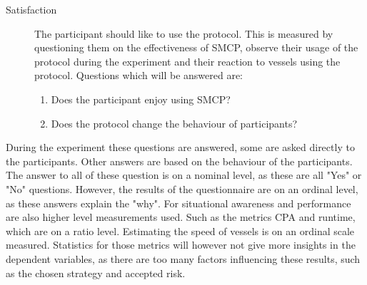 \begin{description}
	\item [Satisfaction] \satisfaction The participant should like to use the protocol. This is measured by questioning them on the effectiveness of \ac{SMCP}, observe their usage of the protocol during the experiment and their reaction to vessels using the protocol. Questions which will be answered are:
	\begin{enumerate}
		\item Does the participant enjoy using \ac{SMCP}?
		\item Does the protocol change the behaviour of participants?
	\end{enumerate}
\end{description}

During the experiment these questions are answered, some are asked directly to the participants. Other answers are based on the behaviour of the participants. The answer to all of these question is on a nominal level, as these are all "Yes" or "No" questions. However, the results of the questionnaire are on an ordinal level, as these answers explain the "why". For situational awareness and performance are also higher level measurements used. Such as the metrics \ac{CPA} and runtime, which are on a ratio level. Estimating the speed of vessels is on an ordinal scale measured. Statistics for those metrics will however not give more insights in the dependent variables, as there are too many factors influencing these results, such as the chosen strategy and accepted risk.


